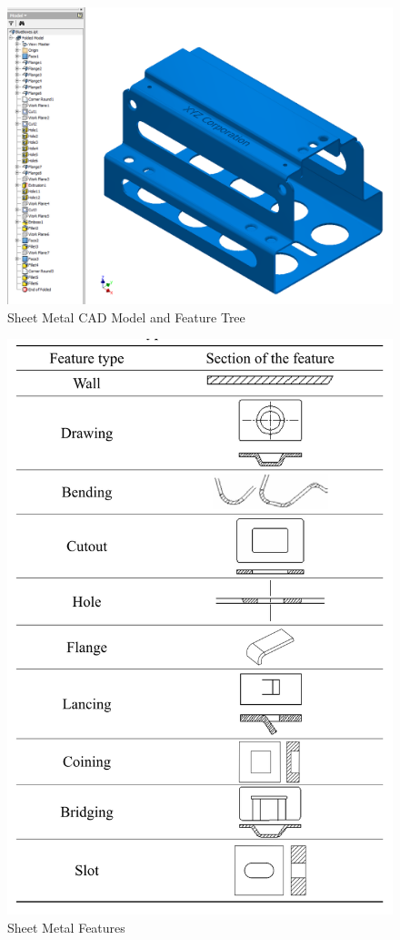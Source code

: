	\begin{figure}[!h]
	\centering
	\includegraphics[width=\linewidth]{../Common/images/blueboxes}
	\caption{Sheet Metal CAD Model and Feature Tree}
	\label{fig_ariplainpair}
	\end{figure}

	\begin{figure}[!h]
	\centering
	\includegraphics[width=0.5\linewidth]{../Common/images/liuFeatures}
	\caption{Sheet Metal Features}
	\label{fig_smtaxonomy}
	\end{figure}

